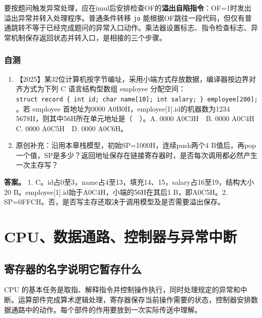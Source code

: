 要按题问触发异常处理，应在imul后安排检查OF的\textbf{溢出自陷指令}：OF=1时发出溢出异常并转入处理程序。普通条件转移 \texttt{jo} 能根据OF跳往一段代码，但仅有普通跳转不等于已经完成题问的异常入口动作。乘法器设置标志、指令检查标志、异常机制保存返回状态并转入口，是相接的三个步骤。

\subsection{自测}\label{co-self4}

\begin{enumerate}
\def\labelenumi{\arabic{enumi}.}
\tightlist
\item
  【2025】某32位计算机按字节编址，采用小端方式存放数据，编译器按边界对齐方式为下列 C 语言结构型数组 employee 分配空间：\texttt{struct\ record\ \{\ int\ id;}\allowbreak{}\texttt{\ char\ name{[}10{]};}\allowbreak{}\texttt{\ int\ salary;}\allowbreak{}\texttt{\ \}\ employee{[}200{]};}\allowbreak{}。若 employee 首地址为0000 A0B0H，employee{[}1{]}.id的机器数为1234 5678H，则其中56H所在单元地址是（　）。A. 0000 A0C3H　B. 0000 A0C4H　C. 0000 A0C5H　D. 0000 A0C6H。
\item
  原创补充：沿用本章栈模型，初始SP=1000H，连续push两个4 B值后，再pop一个值，SP是多少？返回地址保存在链接寄存器时，是否每次调用都必然产生一次主存写？
\end{enumerate}

\textbf{答案。} 1. C。id占0至3，name占4至13，填充14、15，salary占16至19，结构大小20 B。employee{[}1{]}.id始于A0C4H，小端的56H在其后1 B，即A0C5H。2. SP=0FFCH。否，是否写主存还取决于调用模型及是否需要溢出保存。

\chapter{CPU、数据通路、控制器与异常中断}\label{co-ch5}

\section{寄存器的名字说明它暂存什么}\label{co-05-01}

CPU 的基本任务是取指、解释指令并控制操作执行，同时处理规定的异常和中断。运算部件完成算术逻辑处理，寄存器保存当前操作需要的状态，控制器安排数据通路中的动作。每个部件的作用要放到一次实际传送中理解。

